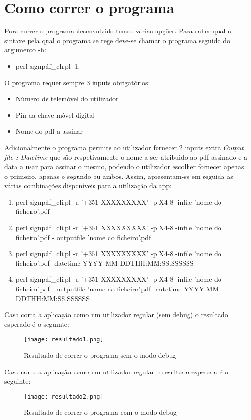 \section{Como correr o programa}

Para correr o programa desenvolvido temos várias opções. Para saber qual a sintaxe pela qual o programa se rege deve-se chamar o programa seguido do argumento -h:
\begin{itemize}
	\item perl signpdf\_cli.pl -h
\end{itemize} 
\hfill\newline
O programa requer sempre 3 inputs obrigatórios:
\begin{itemize}
	\item Número de telemóvel do utilizador
	\item Pin da chave móvel digital
	\item Nome do pdf a assinar
\end{itemize}
\hfill\newline
Adicionalmente o programa permite ao utilizador fornecer 2 inputs extra \textit{Output file} e \textit{Datetime} que são respetivamente o nome a ser atribuido ao pdf assinado e a data a usar para assinar o mesmo, podendo o utilizador escolher fornecer apenas o primeiro, apenas o segundo ou ambos.\newline
Assim, apresentam-se em seguida as várias combinações disponíveis para a utilização da app:
\begin{enumerate}
	\item perl signpdf\_cli.pl -u '+351 XXXXXXXXX' -p X{4-8} -infile 'nome do ficheiro'.pdf
	\item perl signpdf\_cli.pl -u '+351 XXXXXXXXX' -p X{4-8} -infile 'nome do ficheiro'.pdf - outputfile 'nome do ficheiro'.pdf
	\item perl signpdf\_cli.pl -u '+351 XXXXXXXXX' -p X{4-8} -infile 'nome do ficheiro'.pdf -datetime YYYY-MM-DDTHH:MM:SS.SSSSSS
	\item perl signpdf\_cli.pl -u '+351 XXXXXXXXX' -p X{4-8} -infile 'nome do ficheiro'.pdf - outputfile 'nome do ficheiro'.pdf -datetime YYYY-MM-DDTHH:MM:SS.SSSSSS
\end{enumerate}


Caso corra a aplicação como um utilizador regular (sem debug) o resultado esperado é o seguinte:
\begin{figure}[H]

  \centering
  \captionsetup{justification=centering}

  \texttt{[image: resultado1.png]}
  
  \caption {Resultado de correr o programa sem o modo debug}

\end{figure}


 Caso corra a aplicação como um utilizador regular o resultado esperado é o seguinte:

\begin{figure}[H]

  \centering
  \captionsetup{justification=centering}

  \texttt{[image: resultado2.png]}
  
  \caption {Resultado de correr o programa com o modo debug}

\end{figure}







